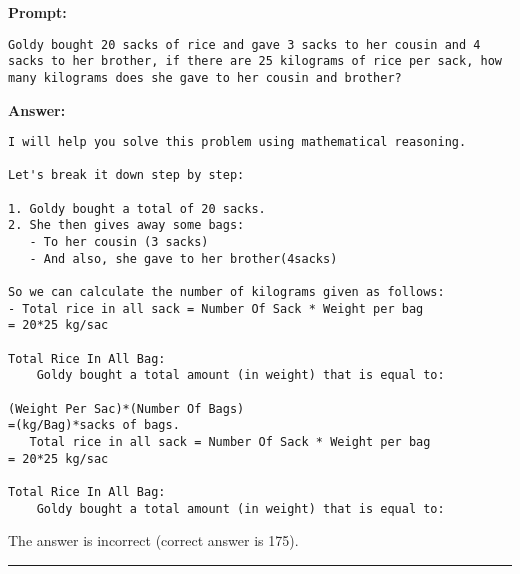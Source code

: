 \begin{displayquote}
	\textbf{Prompt:}
	\begin{Verbatim}[fontsize=\small,breaklines]
Goldy bought 20 sacks of rice and gave 3 sacks to her cousin and 4 sacks to her brother, if there are 25 kilograms of rice per sack, how many kilograms does she gave to her cousin and brother?
	\end{Verbatim}

	\textbf{Answer:}
	\begin{Verbatim}[fontsize=\small,breaklines]
I will help you solve this problem using mathematical reasoning.

Let's break it down step by step:

1. Goldy bought a total of 20 sacks.
2. She then gives away some bags:
   - To her cousin (3 sacks)
   - And also, she gave to her brother(4sacks)

So we can calculate the number of kilograms given as follows:
- Total rice in all sack = Number Of Sack * Weight per bag
= 20*25 kg/sac

Total Rice In All Bag:
    Goldy bought a total amount (in weight) that is equal to:

(Weight Per Sac)*(Number Of Bags)
=(kg/Bag)*sacks of bags.
   Total rice in all sack = Number Of Sack * Weight per bag
= 20*25 kg/sac

Total Rice In All Bag:
    Goldy bought a total amount (in weight) that is equal to:
	\end{Verbatim}
\end{displayquote}
The answer is incorrect (correct answer is 175).

\noindent\rule{\textwidth}{0.4pt}

